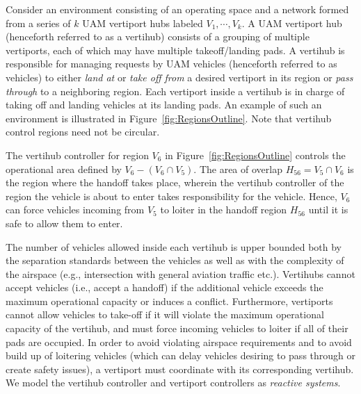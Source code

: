  Consider an environment consisting of an operating space and a network formed from a series of $k$ UAM vertiport hubs labeled $V_1,\cdots,V_k$. A UAM vertiport hub (henceforth referred to as a vertihub) consists of a grouping of multiple vertiports, each of which may have multiple takeoff/landing pads. A vertihub is responsible for managing requests by UAM vehicles (henceforth referred to as vehicles) to either \emph{land at} or \emph{take off from} a desired vertiport in its region or \emph{pass through} to a neighboring region. Each vertiport inside a vertihub is in charge of taking off and landing vehicles at its landing pads. An example of such an environment is illustrated in Figure~\ref{fig:RegionsOutline}. Note that vertihub control regions need not be circular. 
\begin{example}
The vertihub controller for region $V_6$ in Figure~\ref{fig:RegionsOutline} controls the operational area defined by $V_6 - (V_6 \cap V_5)$. The area of overlap $H_{56} = V_5 \cap V_6$ is the region where the handoff takes place, wherein the vertihub controller of the region the vehicle is about to enter takes responsibility for the vehicle.
Hence, $V_6$ can force vehicles incoming from $V_5$ to loiter in the handoff region $H_{56}$ until it is safe to allow them to enter.
\end{example}

The number of vehicles allowed inside each vertihub is upper bounded both by the separation standards between the vehicles as well as with the complexity of the airspace (e.g., intersection with general aviation traffic etc.).
Vertihubs cannot accept vehicles (i.e., accept a handoff) if the additional vehicle exceeds the maximum operational capacity or induces a conflict. Furthermore, vertiports cannot allow vehicles to take-off if it will violate the maximum operational capacity of the vertihub, and must force incoming vehicles to loiter if all of their pads are occupied. In order to avoid violating airspace requirements and to avoid build up of loitering vehicles (which can delay vehicles desiring to pass through or create safety issues), a vertiport must coordinate with its corresponding vertihub. We model the vertihub controller and vertiport controllers as \emph{reactive systems}.


